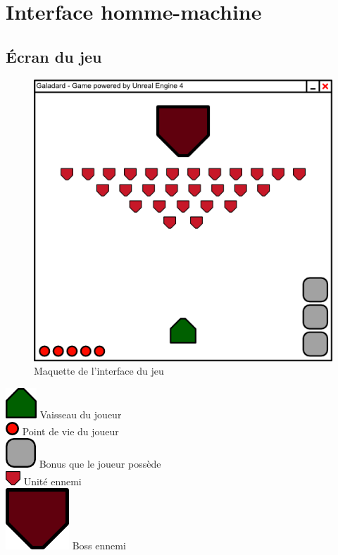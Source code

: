 \documentclass[11pt, a4paper, oneside]{article}
\begin{document}
\section{Interface homme-machine}
\subsection{Écran du jeu}
\begin{figure}[h]
	\begin{center}
	\includegraphics[scale=0.2]{interface}
	\caption{Maquette de l'interface du jeu}
	\end{center}
\end{figure}
\includegraphics[scale=0.1]{joueur} Vaisseau du joueur\\[0.2cm]
\includegraphics[scale=0.2]{pointdevie} Point de vie du joueur\\[0.2cm]
\includegraphics[scale=0.1]{bonus} Bonus que le joueur possède\\[0.2cm]
\includegraphics[scale=0.2]{ennemi} Unité ennemi\\[0.2cm]
\includegraphics[scale=0.05]{boss} Boss ennemi
\newpage
\end{document}
